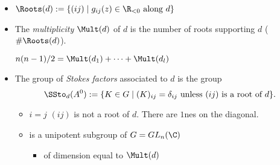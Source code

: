 \begin{defn}
\begin{center}
  \end{center}
\end{defn}
\begin{defn}
  \begin{itemize}
    \item $\Roots(d):=\{(ij)\mid g_{ij}(z)\in \R_{<0} \text{ along } d \}$
    \item The \emph{multiplicity} $\Mult(d)$ of $d$ is the number of roots
      supporting $d$ ($\#\Roots(d)$).
      \begin{rem}
        $n(n-1)/2=\Mult(d_1)+\cdots+\Mult(d_l)$
      \end{rem}
    \item The group of \emph{Stokes factors} associated to $d$ is the group
    \[
      \SSto_d(A^0) := \{K \in G \mid (K)_{ij}
        =\delta_{ij} \text{ unless } (ij) \text{ is a root of } d\}.
    \]
    \begin{itemize}
      \item $i=j$ \Rightarrow $(ij)$ is not a root of $d$. There are $1$nes
        on the diagonal.
      \item is a unipotent subgroup of $G=GL_n(\C)$
        \begin{itemize}
          \item of dimension equal to $\Mult(d)$
        \end{itemize}
    \end{itemize}
  \end{itemize}
\end{defn}

